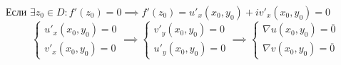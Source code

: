 	\begin{remark}
		Если $\exists z_0 \in D: f'(z_0) = 0 \implies f'(z_0) = u'_x(x_0, y_0) + i v'_x(x_0, y_0) = 0$
		\[ \begin{cases} 
				u'_x (x_0, y_0) = 0\\ 
				v'_x(x_0, y_0) = 0 
			\end{cases} 
			\implies 
			\begin{cases} 
				v'_y (x_0, y_0) = 0\\ 
				u'_y(x_0, y_0) = 0
			\end{cases} 
			\implies 
			\begin{cases} 
				\nabla u(x_0, y_0) = \overline{0}\\ 
				\nabla v(x_0, y_0) = \overline{0}
			\end{cases} \] 
	\end{remark}
	\newpage
	
